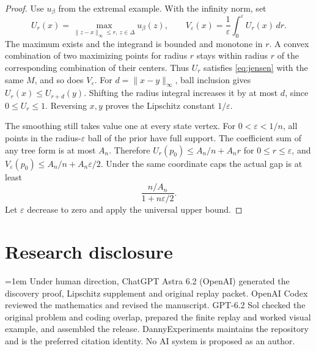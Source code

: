 \documentclass[11pt,a4paper]{amsart}
\begin{document}
\begin{proof}
Use \(u_\beta\) from the extremal example. With the infinity norm, set
\[
 U_r(x)=\max_{\|z-x\|_\infty\le r,\ z\in\Delta}u_\beta(z),
 \qquad
 V_\varepsilon(x)=\frac1\varepsilon\int_0^\varepsilon U_r(x)\,dr.
\]
The maximum exists and the integrand is bounded and monotone in \(r\). A convex combination of two maximizing points for radius \(r\) stays within radius \(r\) of the corresponding combination of their centers. Thus \(U_r\) satisfies \eqref{eq:jensen} with the same \(M\), and so does \(V_\varepsilon\). For \(d=\|x-y\|_\infty\), ball inclusion gives \(U_r(x)\le U_{r+d}(y)\). Shifting the radius integral increases it by at most \(d\), since \(0\le U_r\le1\). Reversing \(x,y\) proves the Lipschitz constant \(1/\varepsilon\).

The smoothing still takes value one at every state vertex. For \(0<\varepsilon<1/n\), all points in the radius-\(\varepsilon\) ball of the prior have full support. The coefficient sum of any tree form is at most \(A_n\). Therefore \(U_r(p_0)\le A_n/n+A_n r\) for \(0\le r\le\varepsilon\), and \(V_\varepsilon(p_0)\le A_n/n+A_n\varepsilon/2\). Under the same coordinate caps the actual gap is at least
\[
 \frac{n/A_n}{1+n\varepsilon/2}.
\]
Let \(\varepsilon\) decrease to zero and apply the universal upper bound.
\end{proof}

\section*{Research disclosure}

\begingroup{}\emergencystretch=1em\relax
Under human direction, ChatGPT Astra 6.2 (OpenAI) generated the discovery proof, Lipschitz supplement and original replay packet. OpenAI Codex reviewed the mathematics and revised the manuscript. GPT-6.2 Sol checked the original problem and coding overlap, prepared the finite replay and worked visual example, and assembled the release. DannyExperiments maintains the repository and is the preferred citation identity. No AI system is proposed as an author.
\par\endgroup
\end{document}
